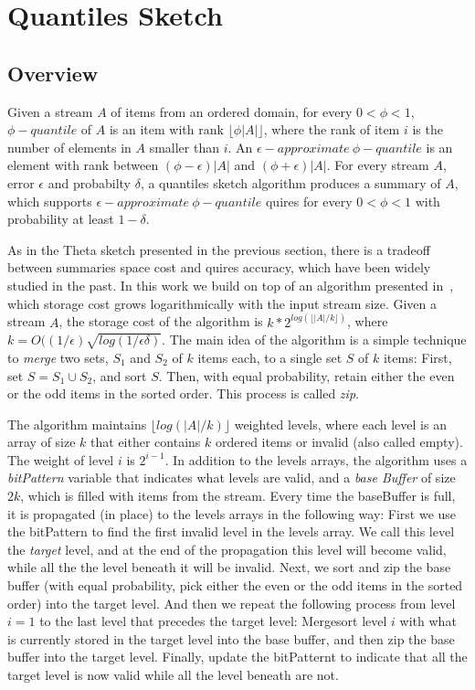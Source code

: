 \section{Quantiles Sketch}
\label{sec:quantiles}

\subsection{Overview}

Given a stream $A$ of items from an ordered domain, for every
$0< \phi < 1$, $\phi - quantile$ of $A$ is an item with rank 
$\lfloor \phi |A| \rfloor$, where the rank of item $i$ is the
number of elements in $A$ smaller than $i$.
An $\epsilon -approximate ~\phi - quantile$ is an element
with rank between $ (\phi - \epsilon) |A|$ and $ (\phi +
\epsilon) |A|$.
For every stream $A$, error $\epsilon$ and probabilty $\delta$,
a quantiles sketch algorithm produces a summary of $A$, which
supports $\epsilon -approximate ~\phi - quantile$ quires for
every $0< \phi < 1$ with probability
at least $1 - \delta$.

As in the Theta sketch presented in the previous section, there
is a tradeoff between summaries space cost and quires accuracy,
which have been widely studied in the past.
In this work we build on top of an algorithm presented
in~\cite{}, which storage cost grows logarithmically with the
input stream size.
Given a stream $A$, the storage cost of the algorithm is
$k*2^{log(\lfloor |A|/k \rfloor)}$, where $k = O((1/\epsilon)
\sqrt{log(1/\epsilon \delta)}$.
The main idea of the algorithm is a simple technique to
\emph{merge} two sets, $S_1$ and $S_2$ of $k$ items each, to a
single set $S$ of $k$ items:
First, set $S = S_1 \cup S_2$, and sort $S$. 
Then, with equal probability, retain either the even or the odd
items in the sorted order. 
This process is called \emph{zip}.


The algorithm maintains $\lfloor log(|A|/k) \rfloor$ weighted
levels, where each level is an array of size $k$ that either contains $k$ ordered
items or invalid (also called empty).
The weight of level $i$ is $2^{i-1}$.
In addition to the levels arrays, the algorithm uses a
\emph{bitPattern} variable that indicates what levels are valid,
and a \emph{base Buffer} of size $2k$, which is filled with items
from the stream.
Every time the baseBuffer is full, it is propagated (in place) to
the levels arrays in the following way:
First we use the bitPattern to find the first invalid level in
the levels array. 
We call this level the \emph{target} level, and at the end of
the propagation this level will become valid, while all the the
level beneath it will be invalid.
Next, we sort and zip the base buffer (with equal probability,
pick either the even or the odd items in the sorted order) into
the target level.
And then we repeat the following process from level $i=1$ to the
last level that precedes the target level:
Mergesort level $i$ with what is currently stored in the target
level into the base buffer, and then zip the base buffer into the
target level.
Finally, update the bitPatternt to indicate that all the target
level is now valid while all the level beneath are not.

